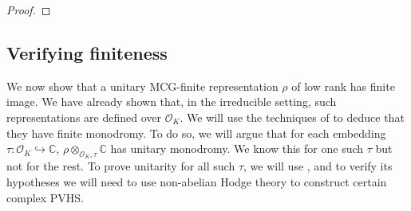 \begin{proof}
%
\end{proof}

\subsection{Verifying finiteness}
\label{subsection:finiteness}
We now show that a unitary MCG-finite representation $\rho$ of low rank has finite image. We have already shown that, in the irreducible setting, such representations are defined over $\mathscr{O}_K$. We will use the techniques of \cite{LL:geometric-local-systems} to deduce that they have finite monodromy. To do so, we will argue that for each embedding $\tau: \mathscr{O}_K\hookrightarrow\mathbb{C}$, $\rho\otimes_{\mathscr{O}_K, \tau}\mathbb{C}$ has unitary monodromy. We know this for one such $\tau$ but not for the rest.
To prove unitarity for all such $\tau$, we will use \cite[Theorem
1.2.12]{LL:geometric-local-systems}, and to verify its hypotheses we will need
to use non-abelian Hodge theory to construct certain complex PVHS.


